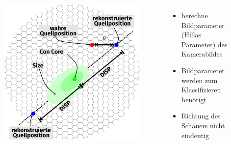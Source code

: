 \documentclass[aspectratio=1610, professionalfonts, 9pt]{beamer}
\begin{document}
\begin{frame}
  \begin{columns}[onlytextwidth]
	\begin{figure}
	  \centering
	  \includegraphics[height=0.8\textheight]{./tikz/Camera/Camera.pdf}
	\end{figure}
	\begin{itemize}
	  \item berechne Bildparameter (Hillas Parameter) des Kamerabildes
	  \item Bildparameter werden zum Klassifizieren benötigt
	  \item Richtung des Schauers nicht eindeutig
	\end{itemize}
  \end{columns}
\end{frame}
\end{document}
